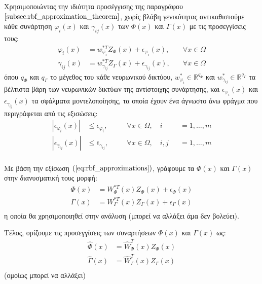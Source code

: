 Χρησιμοποιώντας την ιδιότητα προσέγγισης της παραγράφου $\ref{subsec:rbf_approximation_theorem}$, χωρίς βλάβη γενικότητας αντικαθιστούμε κάθε  συνάρτηση $\varphi_i(x)$ και $\gamma_{ij}(x)$ των $\varPhi(x)$ και $\Gamma(x)$ με τις προσεγγίσεις τους:
\begin{equation}
\begin{alignedat}{2}
	\varphi_i(x) &= w_{\varphi_i}^{*T} Z_{\varPhi}(x) + \epsilon_{\varphi_i}(x), \quad &\forall x \in \Omega \\
	\gamma_{ij}(x) &= w_{\gamma_{ij}}^{*T} Z_{\Gamma}(x) + \epsilon_{\gamma_{ij}}(x), \quad &\forall x \in \Omega
\end{alignedat}
\label{eq:rbf_approximations}
\end{equation}
όπου $q_{\varPhi}$ και $q_{\Gamma}$ το μέγεθος του κάθε νευρωνικού δικτύου, $w_{\varphi_i}^{*} \in \mathbb{R}^{q_{\varPhi}}$ και $w_{\gamma_{ij}}^{*} \in \mathbb{R}^{q_{\Gamma}}$ τα βέλτιστα βάρη των νευρωνικών δικτύων της αντίστοιχης συνάρτησης, και $\epsilon_{\varphi_i}(x)$ και $\epsilon_{\gamma_{ij}}(x)$ τα σφάλματα μοντελοποίησης, τα οποία έχουν ένα άγνωστο άνω φράγμα που περιγράφεται από τις εξισώσεις:
\begin{equation}
\begin{alignedat}{3}
	| \epsilon_{\varphi_i}(x) | &\leq \bar{\epsilon}_{\varphi_i}, \quad &&\forall x \in \Omega, \quad  i&&= 1,\dots,m \\
	| \epsilon_{\gamma_{ij}}(x) | &\leq \bar{\epsilon}_{\gamma_{ij}}, \quad &&\forall x \in \Omega, \quad i,j &&= 1,\dots,m \\
	\end{alignedat}
\end{equation}

Με βάση την εξίσωση $(\ref{eq:rbf_approximations})$, γράφουμε τα $\varPhi(x)$ και $\Gamma(x)$ στην διανυσματική τους μορφή:
\begin{equation}
\begin{split}
	\varPhi(x) &= W_{\varPhi}^{*T}(x)Z_{\varPhi}(x) + \epsilon_{\varPhi}(x) \\ 
	\Gamma(x) &= W_{\Gamma}^{*T}(x)Z_{\Gamma}(x) + \epsilon_{\Gamma}(x) \\
\end{split}	
\end{equation}
η οποία θα χρησιμοποιηθεί στην ανάλυση (μπορεί να αλλάξει άμα δεν βολεύει).

Τέλος, ορίζουμε τις προσεγγίσεις των συναρτήσεων $\varPhi(x)$ και $\Gamma(x)$ ως:
\begin{equation}
\begin{split}
\hat{\varPhi}(x) &= \hat{W}_{\varPhi}^{T}(x)Z_{\varPhi}(x) \\ 
\hat{\Gamma}(x) &= \hat{W}_{\Gamma}^{T}(x)Z_{\Gamma}(x)    \\
\end{split}
\label{eq:online_approximations}
\end{equation}
(ομοίως μπορεί να αλλάξει)

